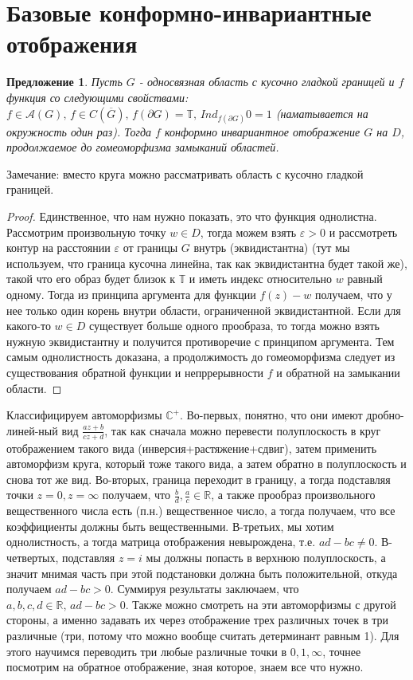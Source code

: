\documentclass[12pt,a4paper]{article} %
\newtheorem{proposition}{Предложение}
\newcommand{\R}{\mathbb{R}}
\newcommand{\Co}{\mathbb{C}}
\begin{document}
	\section{Базовые конформно-инвариантные отображения}
	\begin{proposition}\label{т_Каратеодори_слабая}
		Пусть $G$ - односвязная область с кусочно гладкой границей и $f$ функция со следующими свойствами: $f\in\mathcal{A}(G),\,f\in C(\overline{G}),\,f(\partial G)=\mathbb{T},\,Ind_{f(\partial G)}0=1$ (наматывается на окружность один раз). Тогда $f$ конформно инвариантное отображение $G$ на $D$, продолжаемое до гомеоморфизма замыканий областей.
	\end{proposition}
	Замечание: вместо круга можно рассматривать область с кусочно гладкой границей.
	\begin{proof}
		Единственное, что нам нужно показать, это что функция однолистна. Рассмотрим произвольную точку $w\in D$, тогда можем взять $\varepsilon>0$ и рассмотреть контур на расстоянии $\varepsilon$ от границы $G$ внутрь (эквидистантна) (тут мы используем, что граница кусочна линейна, так как эквидистантна будет такой же), такой что его образ будет близок к $\mathbb{T}$ и иметь индекс относительно $w$ равный одному. Тогда из принципа аргумента для функции $f(z)-w$ получаем, что у нее только один корень внутри области, ограниченной эквидистантной. Если для какого-то $w\in D$ существует больше одного прообраза, то тогда можно взять нужную эквидистантну и получится противоречие с принципом аргумента. Тем самым однолистность доказана, а продолжимость до гомеоморфизма следует из существования обратной функции и непррерывности $f$ и обратной на замыкании области.
	\end{proof}
	Классифицируем автоморфизмы $\Co^{+}$. Во-первых, понятно, что они имеют дробно-линей-ный вид $\displaystyle\frac{az+b}{cz+d}$, так как сначала можно перевести полуплоскость в круг отображением такого вида (инверсия+растяжение+сдвиг), затем применить автоморфизм круга, который тоже такого вида, а затем обратно в полуплоскость и снова тот же вид. Во-вторых, граница переходит в границу, а тогда подставляя точки $z=0, z=\infty$ получаем, что $\frac{b}{d},\frac{a}{c}\in\R$, а также прообраз произвольного вещественного числа есть (п.н.) вещественное число, а тогда получаем, что все коэффициенты должны быть вещественными. В-третьих, мы хотим однолистность, а тогда матрица отображения невырождена, т.е. $ad-bc\neq0$. В-четвертых, подставляя $z=i$ мы должны попасть в верхнюю полуплоскость, а значит мнимая часть при этой подстановки должна быть положительной, откуда получаем $ad-bc>0$. Суммируя результаты заключаем, что $a,b,c,d\in\R,\,ad-bc>0$. Также можно смотреть на эти автоморфизмы с другой стороны, а именно задавать их через отображение трех различных точек в три различные (три, потому что можно вообще считать детерминант равным 1). Для этого научимся переводить три любые различные точки в $0,1,\infty$, точнее посмотрим на обратное отображение, зная которое, знаем все что нужно.
\end{document}
